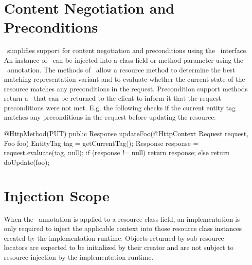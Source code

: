 \section{Content Negotiation and Preconditions}

\jaxrs\ simplifies support for content negotiation and preconditions using the \Request\ interface. An instance of \Request\ can be injected into a class field or method parameter using the \HttpContext\ annotation. The methods of \Request\ allow a resource method to determine the best matching representation variant and to evaluate whether the current state of the resource matches any preconditions in the request. Precondition support methods return a \Response\ that can be returned to the client to inform it that the request preconditions were not met. E.g. the following checks if the current entity tag matches any preconditions in the request before updating the resource:

\begin{listing}{1}
@HttpMethod(PUT)
public Response updateFoo(@HttpContext Request request, Foo foo) {
	EntityTag tag = getCurrentTag();
	Response response = request.evaluate(tag, null);
	if (response != null)
	  return response;
	else
	  return doUpdate(foo);
}
\end{listing}

\section{Injection Scope}

When the \HttpContext\ annotation is applied to a resource class field, an implementation is only required to inject the applicable context into those resource class instances created by the implementation runtime. Objects returned by sub-resource locators are expected to be initialized by their creator and are not subject to resource injection by the implementation runtime.
